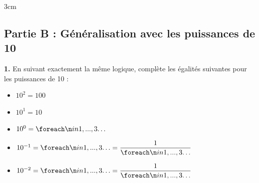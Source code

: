 \documentclass[a4paper]{book}
\begin{document}
    \begin{ZoneReponse}{3cm}
    \end{ZoneReponse}

\subsection*{Partie B : Généralisation avec les puissances de 10}

    \textbf{1.} En suivant exactement la même logique, complète les égalités suivantes pour les puissances de 10 :
    \begin{itemize}[label=$\bullet$, itemsep=0.3cm]
        \item $10^2 = 100$
        \item $10^1 = 10$
        \item $10^0 = \points[3]$
        \item $10^{-1} = \points[3] = \dfrac{1}{\points[3]}$
        \item $10^{-2} = \points[3] = \dfrac{1}{\points[3]}$
    \end{itemize}
    
    \vspace{0.3cm}
\end{document}
